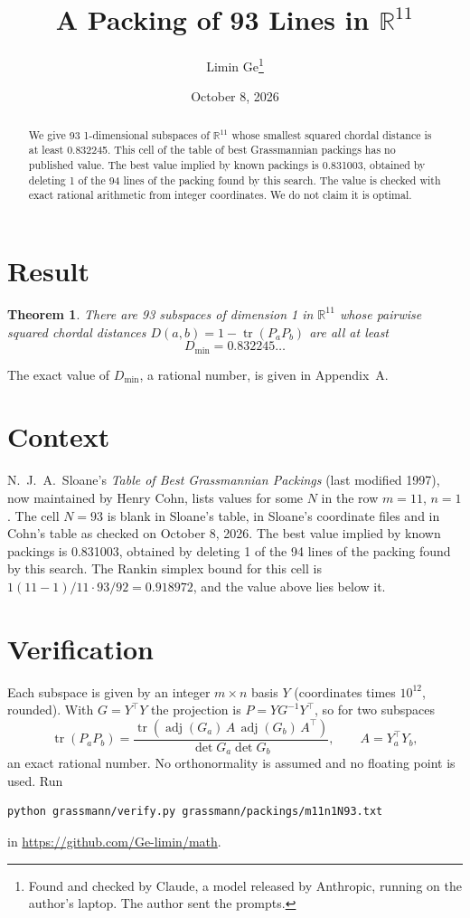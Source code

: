 \documentclass[11pt,a4paper]{article}
\title{A Packing of 93 Lines in $\mathbb{R}^{11}$}
\author{Limin Ge\thanks{Found and checked by Claude, a model released by Anthropic, running on the author's laptop. The author sent the prompts.}}
\date{October 8, 2026}
\newtheorem*{theorem}{Theorem}
\begin{document}
\maketitle
\begin{abstract}
We give 93 1-dimensional subspaces of $\mathbb{R}^{11}$ whose smallest squared chordal distance is at least 0.832245. This cell of the table of best Grassmannian packings has no published value. The best value implied by known packings is 0.831003, obtained by deleting 1 of the 94 lines of the packing found by this search. The value is checked with exact rational arithmetic from integer coordinates. We do not claim it is optimal.
\end{abstract}

\section{Result}
\begin{theorem}
There are 93 subspaces of dimension 1 in $\mathbb{R}^{11}$ whose pairwise squared chordal distances $D(a,b) = 1 - \operatorname{tr}(P_aP_b)$ are all at least
\[ D_{\min} = 0.832245\ldots \]
\end{theorem}
The exact value of $D_{\min}$, a rational number, is given in Appendix~A.


\section{Context}
N.~J.~A.~Sloane's \emph{Table of Best Grassmannian Packings} (last modified 1997), now maintained by Henry Cohn, lists values for some $N$ in the row $m=11$, $n=1$. The cell $N=93$ is blank in Sloane's table, in Sloane's coordinate files and in Cohn's table as checked on October 8, 2026. The best value implied by known packings is 0.831003, obtained by deleting 1 of the 94 lines of the packing found by this search. The Rankin simplex bound for this cell is $1(11-1)/11\cdot 93/92 = 0.918972$, and the value above lies below it.


\section{Verification}
Each subspace is given by an integer $m\times n$ basis $Y$ (coordinates times $10^{12}$, rounded). With $G=Y^\top Y$ the projection is $P=YG^{-1}Y^\top$, so for two subspaces
\[ \operatorname{tr}(P_aP_b)=\frac{\operatorname{tr}(\operatorname{adj}(G_a)\,A\,\operatorname{adj}(G_b)\,A^\top)}{\det G_a\det G_b},\qquad A=Y_a^\top Y_b, \]
an exact rational number. No orthonormality is assumed and no floating point is used. Run
\begin{verbatim}
python grassmann/verify.py grassmann/packings/m11n1N93.txt
\end{verbatim}
in \url{https://github.com/Ge-limin/math}.
\end{document}
